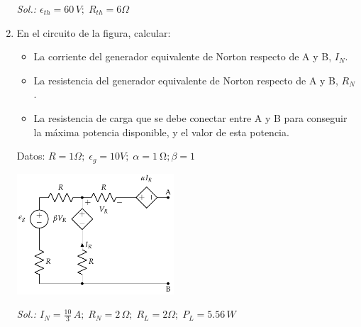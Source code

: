 \begin{enumerate}
    \emph{Sol.: $\epsilon_{th}=60\,V;\;R_{th}=6\Omega$}

  \item En el circuito de la figura, calcular:
    \begin{itemize}
    \item La corriente del generador equivalente de Norton respecto de
      A y B, $I_N$.
    \item La resistencia del generador equivalente de Norton respecto
      de A y B, $R_N$.
    \item La resistencia de carga que se debe conectar entre A y B
      para conseguir la máxima potencia disponible, y el valor de esta
      potencia.
    \end{itemize}

    Datos:
    $R = {1}{\Omega};\; \epsilon_g = {10}{V};\; \alpha = \qty{1}{\ohm}; \beta = 1$

    \begin{center}
      \includegraphics[height=4.5cm]{../figs/norton.pdf}
    \end{center}


\emph{Sol.:
  $I_N=\frac{10}{3}\,A;\; R_N=2\,\Omega;\; R_L=2\Omega;\;
  P_L=5.56\,W$}

\end{enumerate}

